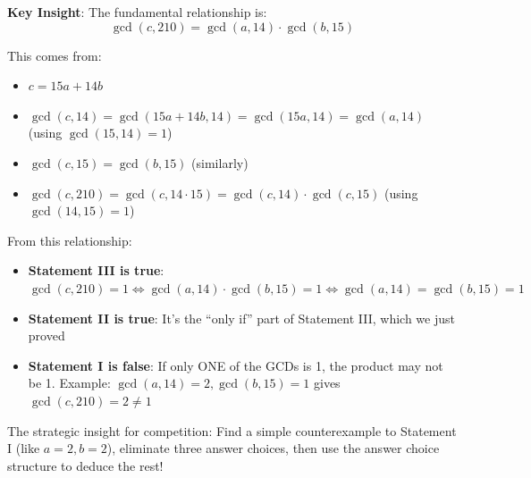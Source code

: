 \documentclass[12pt]{article}
\begin{document}
\begin{keyinsightbox}
\textbf{Key Insight}: The fundamental relationship is:
$$\gcd(c,210) = \gcd(a,14) \cdot \gcd(b,15)$$

This comes from:
\begin{itemize}
    \item $c = 15a + 14b$
    \item $\gcd(c,14) = \gcd(15a+14b, 14) = \gcd(15a, 14) = \gcd(a,14)$ (using $\gcd(15,14)=1$)
    \item $\gcd(c,15) = \gcd(b,15)$ (similarly)
    \item $\gcd(c,210) = \gcd(c,14 \cdot 15) = \gcd(c,14) \cdot \gcd(c,15)$ (using $\gcd(14,15)=1$)
\end{itemize}

From this relationship:
\begin{itemize}
    \item \textbf{Statement III is true}: $\gcd(c,210)=1 \Leftrightarrow \gcd(a,14) \cdot \gcd(b,15)=1 \Leftrightarrow \gcd(a,14)=\gcd(b,15)=1$
    \item \textbf{Statement II is true}: It's the ``only if'' part of Statement III, which we just proved
    \item \textbf{Statement I is false}: If only ONE of the GCDs is 1, the product may not be 1. Example: $\gcd(a,14)=2, \gcd(b,15)=1$ gives $\gcd(c,210)=2 \neq 1$
\end{itemize}

The strategic insight for competition: Find a simple counterexample to Statement I (like $a=2, b=2$), eliminate three answer choices, then use the answer choice structure to deduce the rest!
\end{keyinsightbox}
\end{document}

